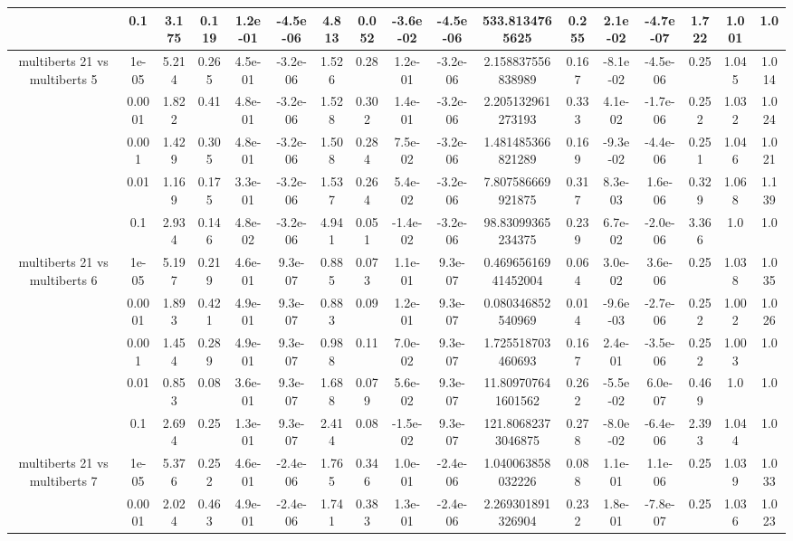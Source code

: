 \begin{tabular}{|c|c|c|c|c|c|c|c|c|c|c|c|c|c|c|c|c|}
 & 0.1 & 3.175 & 0.119 & 1.2e-01 & -4.5e-06 & 4.813 & 0.052 & -3.6e-02 & -4.5e-06 & 533.8134765625 & 0.255 & 2.1e-02 & -4.7e-07 & 1.722 & 1.001 & 1.0 \\
\hline
\multirow{5}{*}{multiberts 21 vs multiberts 5} & 1e-05 & 5.214 & 0.265 & 4.5e-01 & -3.2e-06 & 1.526 & 0.28 & 1.2e-01 & -3.2e-06 & 2.158837556838989 & 0.167 & -8.1e-02 & -4.5e-06 & 0.25 & 1.045 & 1.014 \\
 & 0.0001 & 1.822 & 0.41 & 4.8e-01 & -3.2e-06 & 1.528 & 0.302 & 1.4e-01 & -3.2e-06 & 2.205132961273193 & 0.333 & 4.1e-02 & -1.7e-06 & 0.252 & 1.032 & 1.024 \\
 & 0.001 & 1.429 & 0.305 & 4.8e-01 & -3.2e-06 & 1.508 & 0.284 & 7.5e-02 & -3.2e-06 & 1.481485366821289 & 0.169 & -9.3e-02 & -4.4e-06 & 0.251 & 1.046 & 1.021 \\
 & 0.01 & 1.169 & 0.175 & 3.3e-01 & -3.2e-06 & 1.537 & 0.264 & 5.4e-02 & -3.2e-06 & 7.807586669921875 & 0.317 & 8.3e-03 & 1.6e-06 & 0.329 & 1.068 & 1.139 \\
 & 0.1 & 2.934 & 0.146 & 4.8e-02 & -3.2e-06 & 4.941 & 0.051 & -1.4e-02 & -3.2e-06 & 98.83099365234375 & 0.239 & 6.7e-02 & -2.0e-06 & 3.366 & 1.0 & 1.0 \\
\hline
\multirow{5}{*}{multiberts 21 vs multiberts 6} & 1e-05 & 5.197 & 0.219 & 4.6e-01 & 9.3e-07 & 0.885 & 0.073 & 1.1e-01 & 9.3e-07 & 0.46965616941452004 & 0.064 & 3.0e-02 & 3.6e-06 & 0.25 & 1.038 & 1.035 \\
 & 0.0001 & 1.893 & 0.421 & 4.9e-01 & 9.3e-07 & 0.883 & 0.09 & 1.2e-01 & 9.3e-07 & 0.080346852540969 & 0.014 & -9.6e-03 & -2.7e-06 & 0.252 & 1.002 & 1.026 \\
 & 0.001 & 1.454 & 0.289 & 4.9e-01 & 9.3e-07 & 0.988 & 0.11 & 7.0e-02 & 9.3e-07 & 1.725518703460693 & 0.167 & 2.4e-01 & -3.5e-06 & 0.252 & 1.003 & 1.0 \\
 & 0.01 & 0.853 & 0.08 & 3.6e-01 & 9.3e-07 & 1.688 & 0.079 & 5.6e-02 & 9.3e-07 & 11.809707641601562 & 0.262 & -5.5e-02 & 6.0e-07 & 0.469 & 1.0 & 1.0 \\
 & 0.1 & 2.694 & 0.25 & 1.3e-01 & 9.3e-07 & 2.414 & 0.08 & -1.5e-02 & 9.3e-07 & 121.80682373046875 & 0.278 & -8.0e-02 & -6.4e-06 & 2.393 & 1.044 & 1.0 \\
\hline
\multirow{5}{*}{multiberts 21 vs multiberts 7} & 1e-05 & 5.376 & 0.252 & 4.6e-01 & -2.4e-06 & 1.765 & 0.346 & 1.0e-01 & -2.4e-06 & 1.040063858032226 & 0.088 & 1.1e-01 & 1.1e-06 & 0.25 & 1.039 & 1.033 \\
 & 0.0001 & 2.024 & 0.463 & 4.9e-01 & -2.4e-06 & 1.741 & 0.383 & 1.3e-01 & -2.4e-06 & 2.269301891326904 & 0.232 & 1.8e-01 & -7.8e-07 & 0.25 & 1.036 & 1.023 \\

\end{tabular}
